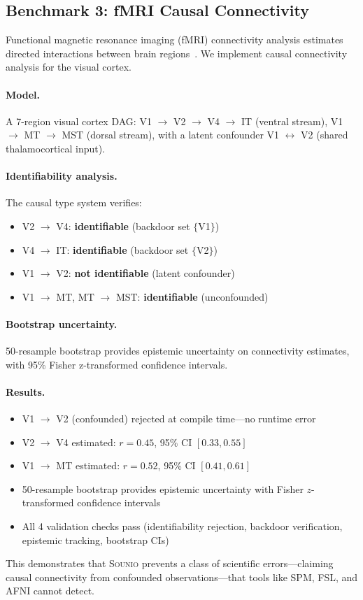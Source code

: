 \documentclass[acmsmall,screen,review,anonymous]{acmart}
\newcommand{\sounio}{\textsc{Sounio}\xspace}
\begin{document}
\subsection{Benchmark 3: fMRI Causal Connectivity}

Functional magnetic resonance imaging (fMRI) connectivity
analysis estimates directed interactions between brain
regions~\cite{eklund2016cluster}.
We implement causal connectivity analysis for the visual cortex.

\paragraph{Model.}
A 7-region visual cortex DAG:
V1 $\to$ V2 $\to$ V4 $\to$ IT (ventral stream),
V1 $\to$ MT $\to$ MST (dorsal stream),
with a latent confounder V1 $\leftrightarrow$ V2
(shared thalamocortical input).

\paragraph{Identifiability analysis.}
The causal type system verifies:
\begin{itemize}
  \item V2 $\to$ V4: \textbf{identifiable} (backdoor set $\{$V1$\}$)
  \item V4 $\to$ IT: \textbf{identifiable} (backdoor set $\{$V2$\}$)
  \item V1 $\to$ V2: \textbf{not identifiable} (latent confounder)
  \item V1 $\to$ MT, MT $\to$ MST: \textbf{identifiable} (unconfounded)
\end{itemize}

\paragraph{Bootstrap uncertainty.}
50-resample bootstrap provides epistemic uncertainty on connectivity
estimates, with 95\% Fisher z-transformed confidence intervals.

\paragraph{Results.}
\begin{itemize}
  \item V1 $\to$ V2 (confounded) rejected at compile time---no runtime error
  \item V2 $\to$ V4 estimated: $r = 0.45$, 95\% CI $[0.33, 0.55]$
  \item V1 $\to$ MT estimated: $r = 0.52$, 95\% CI $[0.41, 0.61]$
  \item 50-resample bootstrap provides epistemic uncertainty
        with Fisher $z$-transformed confidence intervals
  \item All 4 validation checks pass (identifiability rejection,
        backdoor verification, epistemic tracking, bootstrap CIs)
\end{itemize}
This demonstrates that \sounio prevents a class of
scientific errors---claiming causal connectivity from confounded
observations---that tools like SPM, FSL, and AFNI cannot detect.
\end{document}
